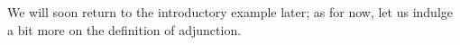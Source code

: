 %
%
%

We will soon return to the introductory example later; as for now, let us indulge a bit more on the definition of adjunction.

